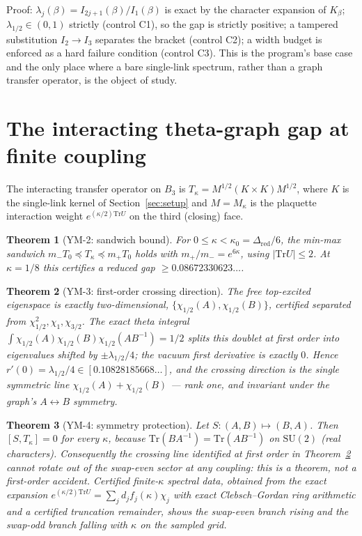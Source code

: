 \documentclass[aps,prd,twocolumn,superscriptaddress,nofootinbib]{revtex4-2}
\newcommand{\SU}{\mathrm{SU}(2)}
\newcommand{\Tr}{\mathrm{Tr}}
\newtheorem{theorem}{Theorem}
\begin{document}
Proof: $\lambda_j(\beta)=I_{2j+1}(\beta)/I_1(\beta)$ is exact by the
character expansion of $K_\beta$; $\lambda_{1/2}\in(0,1)$ strictly
(control C1), so the gap is strictly positive; a tampered substitution
$I_2\to I_3$ separates the bracket (control C2); a width budget is
enforced as a hard failure condition (control C3). This is the program's
base case and the only place where a bare single-link spectrum, rather
than a graph transfer operator, is the object of study.

\section{The interacting theta-graph gap at finite coupling}\label{sec:interacting}

The interacting transfer operator on $B_3$ is
$T_\kappa = M^{1/2}(K\times K)M^{1/2}$, where $K$ is the single-link
kernel of Section~\ref{sec:setup} and $M=M_\kappa$ is the plaquette
interaction weight $e^{(\kappa/2)\Tr U}$ on the third (closing) face.

\begin{theorem}[YM-2: sandwich bound]\label{thm:ym2}
For $0\le\kappa<\kappa_0=\Delta_{\mathrm{red}}/6$, the min-max sandwich
$m_-T_0\preceq T_\kappa\preceq m_+T_0$ holds with
$m_+/m_-=e^{6\kappa}$, using $|\Tr U|\le 2$. At $\kappa=1/8$ this
certifies a reduced gap $\ge 0.08672330623\ldots$.
\end{theorem}

\begin{theorem}[YM-3: first-order crossing direction]\label{thm:ym3}
The free top-excited eigenspace is exactly two-dimensional,
$\{\chi_{1/2}(A),\chi_{1/2}(B)\}$, certified separated from
$\chi_{1/2}^2,\chi_1,\chi_{3/2}$. The exact theta integral
$\int\chi_{1/2}(A)\chi_{1/2}(B)\chi_{1/2}(AB^{-1}) = 1/2$ splits this
doublet at first order into eigenvalues shifted by $\pm\lambda_{1/2}/4$;
the vacuum first derivative is exactly $0$. Hence
$r'(0)=\lambda_{1/2}/4\in[0.10828185668\ldots]$, and the crossing
direction is the single symmetric line
$\chi_{1/2}(A)+\chi_{1/2}(B)$ --- rank one, and invariant under the
graph's $A\leftrightarrow B$ symmetry.
\end{theorem}

\begin{theorem}[YM-4: symmetry protection]\label{thm:ym4}
Let $S:(A,B)\mapsto(B,A)$. Then $[S,T_\kappa]=0$ for \emph{every}
$\kappa$, because $\Tr(BA^{-1})=\Tr(AB^{-1})$ on $\SU$ (real characters).
Consequently the crossing line identified at first order in
Theorem~\ref{thm:ym3} cannot rotate out of the swap-even sector at any
coupling: this is a theorem, not a first-order accident. Certified
finite-$\kappa$ spectral data, obtained from the exact expansion
$e^{(\kappa/2)\Tr U}=\sum_j d_j f_j(\kappa)\chi_j$ with exact
Clebsch--Gordan ring arithmetic and a certified truncation remainder,
shows the swap-even branch rising and the swap-odd branch falling with
$\kappa$ on the sampled grid.
\end{theorem}
\end{document}
